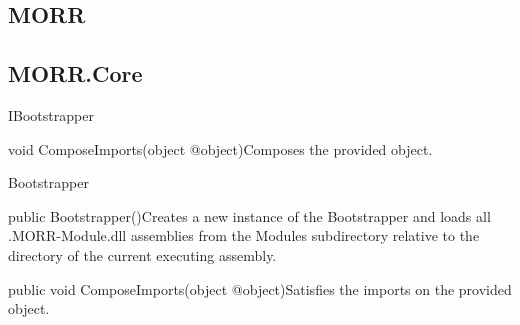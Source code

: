 \subsection{MORR}

\subsection*{MORR.Core}

\begin{interface}{IBootstrapper}



    \begin{methods}
        \begin{method}{void ComposeImports(object @object)}{Composes the provided object.}
            \begin{parameters}
            \end{parameters}
        \end{method}
    \end{methods}
\end{interface}

\begin{class}{Bootstrapper}
    


    \begin{methods}
        \begin{method}{public Bootstrapper()}{Creates a new instance of the Bootstrapper and loads all .MORR-Module.dll assemblies from the Modules subdirectory relative to the directory of the current executing assembly.}
        \end{method}
        \begin{method}{public void ComposeImports(object @object)}{Satisfies the imports on the provided object.}
            \begin{parameters}
            \end{parameters}
        \end{method}
    \end{methods}
\end{class}

